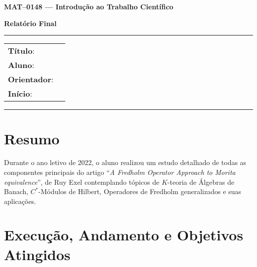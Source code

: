 \documentclass[11pt,a4paper]{amsart}
\newcommand{\titulo}{
  \noindent
  \centerline{
    \bfseries \Large MAT--0148 --- Introdução ao Trabalho Científico
  }
  \vspace*{1em}
  \noindent
  \centerline{
    \bfseries \large Relatório Final
  }
  \vspace*{1.5em}
}
\newcommand{\cabecalho}{
  \hrule
  \medskip
  \begin{tabular}[h]{ll}
    {\bfseries Título}: &\usebox{\projetobox}\\
    {\bfseries Aluno}: &\usebox{\alunobox}\\
    {\bfseries Orientador}: &\usebox{\orientbox}\\
    {\bfseries Início}: &\usebox{\semanobox}
   \end{tabular}
  \medskip
  \hrule
}
\begin{document}
\titulo{}
\cabecalho{}

\section{Resumo }

Durante o ano letivo de 2022, o aluno realizou um estudo detalhado de todas as componentes principais do artigo ``\textit{A Fredholm Operator Approach to Morita equivalence}'', de Ruy Exel \cite{exel7fredholm} contemplando tópicos de $K$-teoria de Álgebras de Banach, \ensuremath{C^*}-Módulos de Hilbert, Operadores de Fredholm generalizados e suas aplicações. 

\section{Execução, Andamento e Objetivos Atingidos}
\end{document}
